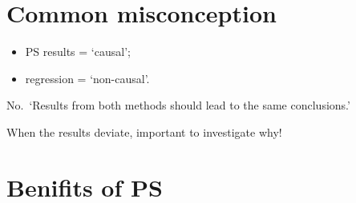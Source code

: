 \documentclass[
]{book}
\providecommand{\tightlist}{%
  \setlength{\itemsep}{0pt}\setlength{\parskip}{0pt}}
\begin{document}
\hypertarget{common-misconception}{%
\section{Common misconception}\label{common-misconception}}

\begin{itemize}
\tightlist
\item
  PS results = `causal';
\item
  regression = `non-causal'.
\end{itemize}

No.~`Results from both methods should lead to the same conclusions.' \citep{d1998propensity}

When the results deviate, important to investigate why!

\hypertarget{benifits-of-ps}{%
\section{Benifits of PS}\label{benifits-of-ps}}
\end{document}
